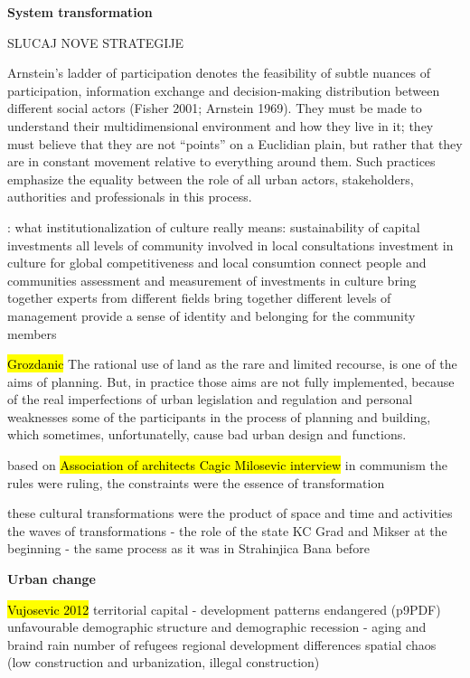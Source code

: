 \documentclass[11pt]{report}
\begin{document}
\textbf{System transformation}

SLUCAJ NOVE STRATEGIJE

Arnstein’s ladder of participation denotes the feasibility of subtle nuances of participation, information exchange and decision-making distribution between different social actors (Fisher 2001; Arnstein 1969).  
They must be made to understand their multidimensional environment and how they live in it; they must believe that they are not “points” on a Euclidian plain, but rather that they are in constant movement relative to everything around them. Such practices emphasize the equality between the role of all urban actors, stakeholders, authorities and professionals in this process.

\cite{Volic et al, 2012}:
what institutionalization of culture really means:
    sustainability of capital investments
    all levels of community involved in local consultations
    investment in culture for global competitiveness and local consumtion
    connect people and communities
    assessment and measurement of investments in culture
    bring together experts from different fields
    bring together different levels of management
    provide a sense of identity and belonging for the community members

\hl{Grozdanic}
The rational use of land as the rare and limited recourse, is one of the aims of planning. But, in practice those aims are  not  fully  implemented, because  of  the  real  imperfections  of  urban  legislation  and regulation and personal weaknesses some of the participants in the process of planning and building, which sometimes, unfortunatelly, cause bad urban design and functions.

based on \hl{Association of architects Cagic Milosevic interview}
in communism the rules were ruling, the constraints were the essence of transformation

these cultural transformations were the product of space and time and activities
the waves of transformations -  the role of the state
KC Grad and Mikser at the beginning - the same process as it was in Strahinjica Bana before

\textbf{Urban change}

\hl{Vujosevic 2012}
territorial capital - development patterns endangered  (p9PDF)
    unfavourable demographic structure and demographic recession - aging and braind rain
    number of refugees
    regional development differences
    spatial chaos (low construction and urbanization, illegal construction)
\end{document}
